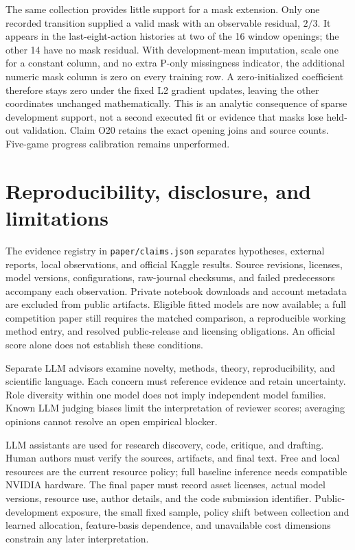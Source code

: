 \documentclass[11pt]{article}
\begin{document}
The same collection provides little support for a mask extension. Only one recorded transition supplied a valid mask with an observable residual, $2/3$. It appears in the last-eight-action histories at two of the 16 window openings; the other 14 have no mask residual. With development-mean imputation, scale one for a constant column, and no extra P-only missingness indicator, the additional numeric mask column is zero on every training row. A zero-initialized coefficient therefore stays zero under the fixed L2 gradient updates, leaving the other coordinates unchanged mathematically. This is an analytic consequence of sparse development support, not a second executed fit or evidence that masks lose held-out validation. Claim O20 retains the exact opening joins and source counts. Five-game progress calibration remains unperformed.

\section{Reproducibility, disclosure, and limitations}
The evidence registry in \texttt{paper/claims.json} separates hypotheses, external reports, local observations, and official Kaggle results. Source revisions, licenses, model versions, configurations, raw-journal checksums, and failed predecessors accompany each observation. Private notebook downloads and account metadata are excluded from public artifacts. Eligible fitted models are now available; a full competition paper still requires the matched comparison, a reproducible working method entry, and resolved public-release and licensing obligations. An official score alone does not establish these conditions.

Separate LLM advisors examine novelty, methods, theory, reproducibility, and scientific language. Each concern must reference evidence and retain uncertainty. Role diversity within one model does not imply independent model families. Known LLM judging biases limit the interpretation of reviewer scores\cite{judge}; averaging opinions cannot resolve an open empirical blocker.

LLM assistants are used for research discovery, code, critique, and drafting. Human authors must verify the sources, artifacts, and final text. Free and local resources are the current resource policy; full baseline inference needs compatible NVIDIA hardware. The final paper must record asset licenses, actual model versions, resource use, author details, and the code submission identifier. Public-development exposure, the small fixed sample, policy shift between collection and learned allocation, feature-basis dependence, and unavailable cost dimensions constrain any later interpretation.
\end{document}
